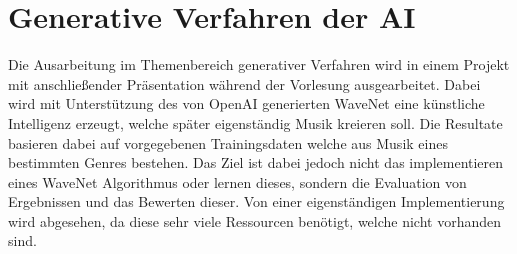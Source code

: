 \chapter{Generative Verfahren der \ac{AI}}

Die Ausarbeitung im Themenbereich generativer Verfahren wird in einem Projekt mit anschließender Präsentation während der Vorlesung ausgearbeitet.
Dabei wird mit Unterstützung des von OpenAI generierten WaveNet eine künstliche Intelligenz erzeugt, welche später eigenständig Musik kreieren soll. Die Resultate basieren dabei auf vorgegebenen Trainingsdaten welche aus Musik eines bestimmten Genres bestehen. Das Ziel ist dabei jedoch nicht das implementieren eines WaveNet Algorithmus oder lernen dieses, sondern die Evaluation von Ergebnissen und das Bewerten dieser. Von einer eigenständigen Implementierung wird abgesehen, da diese sehr viele Ressourcen benötigt, welche nicht vorhanden sind.